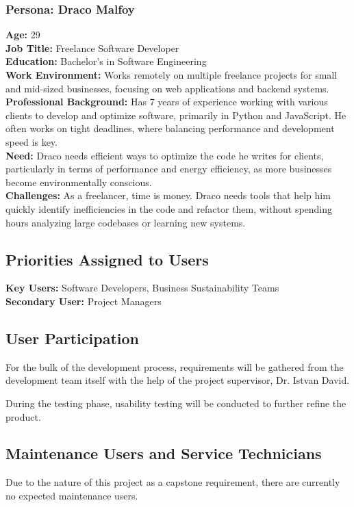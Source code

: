 \documentclass[12pt]{article}
\begin{document}
\subsubsection*{Persona: Draco Malfoy}
\textbf{Age:} 29\\
\textbf{Job Title:} Freelance Software Developer\\
\textbf{Education:} Bachelor's in Software Engineering\\[2mm]
\textbf{Work Environment:} Works remotely on multiple freelance
projects for small and mid-sized businesses, focusing on web
applications and backend systems.\\
\textbf{Professional Background:} Has 7 years of experience working
with various clients to develop and optimize software, primarily in
Python and JavaScript. He often works on tight deadlines, where
balancing performance and development speed is key.\\[2mm]
\textbf{Need:} Draco needs efficient ways to optimize the code he
writes for clients, particularly in terms of performance and energy
efficiency, as more businesses become environmentally conscious.\\
\textbf{Challenges:} As a freelancer, time is money. Draco needs
tools that help him quickly identify inefficiencies in the code and
refactor them, without spending hours analyzing large codebases or
learning new systems.

\subsection{Priorities Assigned to Users}
\textbf{Key Users:} Software Developers, Business Sustainability Teams \\
\textbf{Secondary User:} Project Managers

\subsection{User Participation}
For the bulk of the development process, requirements will be
gathered from the development team itself with the help of the
project supervisor, Dr. Istvan David.

During the testing phase, usability testing will be conducted to
further refine the product.

\subsection{Maintenance Users and Service Technicians}
Due to the nature of this project as a capstone requirement, there
are currently no expected maintenance users.
\end{document}
